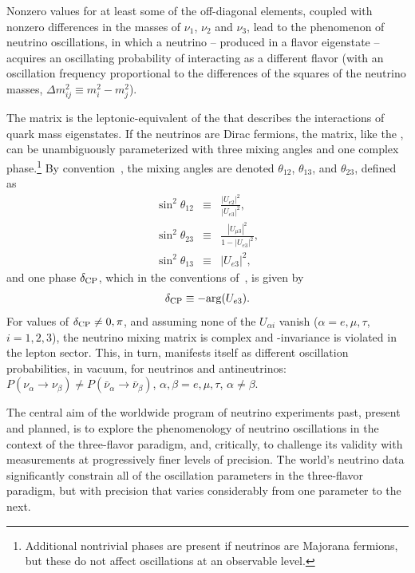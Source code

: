 Nonzero values for at least some of the off-diagonal elements, coupled with nonzero 
differences in the masses of $\nu_1$, $\nu_2$ and $\nu_3$, lead to the phenomenon of 
neutrino oscillations, in which a neutrino -- %
produced in a  
flavor eigenstate -- acquires an oscillating probability 
of interacting as a different flavor (with an oscillation frequency proportional to 
the differences of the squares of the neutrino masses, $\Delta m^2_{ij}\equiv m_i^2-m_j^2$). %


The  matrix is the leptonic-equivalent of the  %
that describes the  interactions of quark mass 
eigenstates. If the neutrinos are Dirac fermions, the  matrix, 
like the , can be unambiguously parameterized with three mixing 
angles and one complex phase.\footnote{Additional nontrivial phases are present 
if neutrinos are Majorana fermions, but these do not affect oscillations at 
an observable level.} By convention~\cite{Tanabashi:2018oca}, the mixing angles 
are denoted $\theta_{12}$, $\theta_{13}$, and $\theta_{23}$, defined as
\begin{eqnarray}
\sin^2\theta_{12} &\equiv& \frac{|U_{e2}|^2}{|U_{e3}|^2}, \\
\sin^2\theta_{23} &\equiv& \frac{|U_{\mu3}|^2}{1-|U_{e3}|^2}, \\
\sin^2\theta_{13} &\equiv& |U_{e3}|^2,
\end{eqnarray} 
and one phase $\delta_{\rm CP}$, which in the conventions of~\cite{Tanabashi:2018oca}, is given by
\begin{equation}
\delta_{\rm CP} \equiv -{\rm arg}(U_{e3}).
\end{equation}
For values of $\delta_{\rm CP}\neq 0,\pi$, and assuming none of the $U_{\alpha i}$ 
vanish ($\alpha=e,\mu,\tau$, $i=1,2,3$), the neutrino mixing matrix is complex 
and -invariance is violated in the lepton sector. This, in turn, manifests 
itself as different oscillation probabilities, in vacuum, for neutrinos 
and antineutrinos: $P(\nu_{\alpha}\to\nu_{\beta})\neq 
P(\bar{\nu}_{\alpha}\to\bar{\nu}_{\beta})$, $\alpha,\beta=e,\mu,\tau$, $\alpha\neq\beta$.

The central aim of the worldwide program of %
neutrino experiments past, present and planned, is to explore 
the phenomenology of neutrino oscillations in the context of the 
three-flavor paradigm, and, critically, 
to challenge its validity with measurements at progressively 
finer levels of precision.  The world's neutrino data significantly constrain 
all of the oscillation parameters in the three-flavor paradigm, but 
with precision that varies considerably from one parameter to the next.

